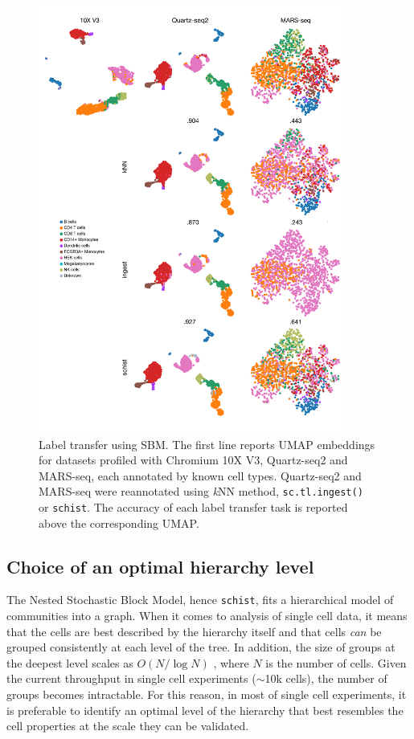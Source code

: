 \documentclass[10pt]{article}
\begin{document}
\begin{figure}[H]
\centering
\includegraphics[keepaspectratio,width=0.9\textwidth,height=\textheight]{Figure_Label_Transfer.png}
\caption[]{Label transfer using SBM. The first line reports UMAP embeddings for datasets profiled with Chromium 10X V3, Quartz-seq2 and  MARS-seq, each annotated by known cell types. Quartz-seq2 and MARS-seq were reannotated using \emph{k}NN method, \texttt{sc.tl.ingest() } or \texttt{schist}. The accuracy of each label transfer task is reported above the corresponding UMAP.} \label{Figure_Label_Transfer}
\end{figure}

\subsection*{Choice of an optimal hierarchy level}

The Nested Stochastic Block Model, hence \texttt{schist}, fits a hierarchical model of communities into a graph. When it comes to analysis of single cell data, it means that the cells are best described by the hierarchy itself and that cells \emph{can} be grouped consistently at each level of the tree. In addition, the size of groups at the deepest level scales as $O(N/\log{N})$ \cite{peixoto_2014_h}, where $N$ is the number of cells. Given the current throughput in single cell experiments ($\sim$10k cells), the number of groups becomes intractable. For this reason, in most of single cell experiments, it is preferable to identify an optimal level of the hierarchy that best resembles the cell properties at the scale they can be validated. 
\end{document}

